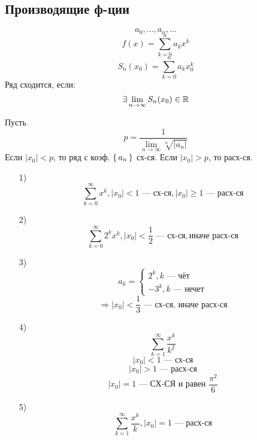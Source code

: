\subsection{Производящие ф-ции}
\[
a_0, \ldots, a_n, \ldots
\]
\[
f(x) = \sum_{k = 0}^{n} a_k x^{k}
\]
\[
S_n(x_0) = \sum_{k = 0}^{n} a_k x_0^{k}
\]
Ряд сходится, если:
\[
\exists \lim_{n\to \infty} S_n(x_0) \in \mathbb{R}
\]
\begin{theorem}
\label{th:gen_functions_1}
Пусть
\[
  p = \frac{1}{\overline{\lim_{n\to\infty}} \sqrt[n]{\left|a_n\right|}}
\]
Если $\left|x_0\right| < p$, то ряд с коэф. $\set{a_n}$ сх-ся. Если $\left|x_0\right| > p$, то расх-ся.
\end{theorem}
\begin{example}
\begin{itemize}
  \item [1) ] \[
  \sum_{k = 0}^{\infty} x^{k}, \left|x_0\right| < 1 \text{ --- сх-ся}, \left|x_0\right| \geq 1 \text{ --- расх-ся}
  \]
\item [2) ] \[
  \sum_{k = 0}^{\infty} 2^{k} x^{k}, \left|x_0\right| < \frac{1}{2} \text{ --- сх-ся}, \text{иначе расх-ся}
\] 
\item [3) ] \[
a_k = \begin{cases}
2^{k}, k \text{ --- чёт} \\
-3^{k}, k \text{ --- нечет}
\end{cases}
\]
\[
\Rightarrow \left|x_0\right| < \frac{1}{3} \text{ --- сх-ся, иначе расх-ся}
\]
\item [4) ] \[
  \sum_{k = 1}^{\infty} \frac{x^{k}}{k^{2}}
\]
\[
  \left|x_0\right| < 1 \text{ --- сх-ся}
\]
\[
  \left|x_0\right| > 1 \text{ --- расх-ся}
\]
\[
  \left|x_0\right| = 1 \text{ --- СХ-СЯ и равен $\frac{\pi^{2}}{6}$}
\]
\item [5) ] \[
  \sum_{k = 1}^{\infty} \frac{x^{k}}{k}, \left|x_0\right| = 1 \text{ --- расх-ся}
\]
\end{itemize}
\end{example} 
